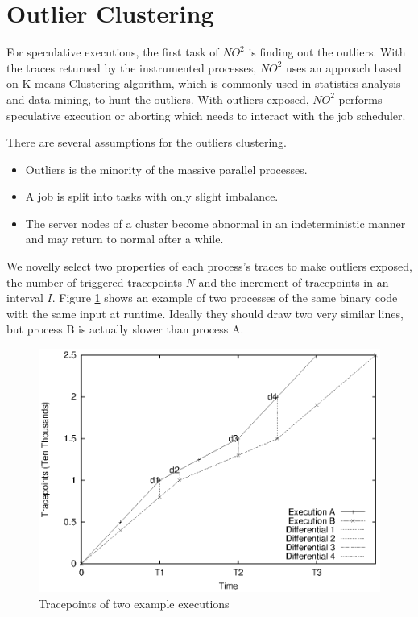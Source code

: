 \section{Outlier Clustering} \label{sec-outlier}

For speculative executions, the first task of $NO^2$ is finding out the outliers.
With the traces returned by the instrumented processes, $NO^2$ uses an approach based on
K-means Clustering algorithm, which is commonly used in statistics analysis and data
mining, to hunt the outliers. With outliers exposed, $NO^2$ performs speculative
execution or aborting which needs to interact with the job scheduler.

There are several assumptions for the outliers clustering.

\begin{itemize}
\item Outliers is the minority of the massive parallel processes.
\item A job is split into tasks with only slight imbalance.
\item The server nodes of a cluster become abnormal in an indeterministic manner and may return to
normal after a while.
\end{itemize}

We novelly select two properties of each process's traces to make outliers exposed, the
number of triggered tracepoints $N$ and the increment of tracepoints in an interval
$I$. Figure \ref{figure:executionsexample} shows an example of two processes of
the same binary code with the same input at runtime. Ideally they should draw two very similar lines,
but process B is actually slower than process A.

\begin{figure}
\centering
\includegraphics[width=0.9\columnwidth]{figures/executions_example.eps}
\caption{Tracepoints of two example executions}
\label{figure:executionsexample}
\end{figure}

